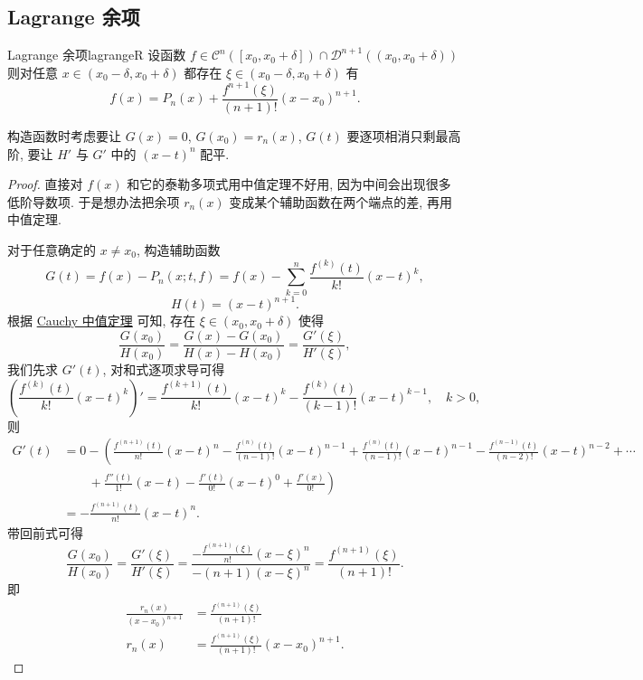 \documentclass[cn,toc=twocol]{elegantbook}
\newcommand{\D}{\mathscr{D}}
\begin{document}
\subsection{Lagrange 余项}

\begin{theorem}{Lagrange 余项}{lagrangeR}
	设函数 $f \in \mathscr{C}^n([x_0,x_0+\delta]) \cap \D^{n+1}((x_0,x_0+\delta))$ 则对任意 $x \in (x_0-\delta,x_0+\delta)$ 都存在 $\xi \in (x_0-\delta,x_0+\delta)$ 有
	\[
		f(x) = P_n(x) + \frac{f^{n+1}(\xi)}{(n+1)!} (x-x_0)^{n+1}.
	\]
\end{theorem}
\begin{idea*}
	构造函数时考虑要让 $G(x)=0$, $G(x_0​)=r_n(x)$, $G(t)$ 要逐项相消只剩最高阶, 要让 $H'$ 与 $G'$ 中的 $(x-t)^n$ 配平.
\end{idea*}

\begin{proof}
	直接对 $f(x)$ 和它的泰勒多项式用中值定理不好用, 因为中间会出现很多低阶导数项. 于是想办法把余项 $r_n(x)$ 变成某个辅助函数在两个端点的差, 再用中值定理.
 
	对于任意确定的 $x \neq x_0$, 构造辅助函数
	\[
		G(t)=f(x)-P_n(x;t,f)=f(x)-\sum_{k=0}^{n}\frac{f^{(k)}(t)}{k!}(x-t)^k,
	\]
	\[
		H(t)=(x-t)^{n+1}.
	\]
	根据 \hyperref[thm:cauchy]{Cauchy 中值定理} 可知, 存在 $\xi \in (x_0,x_0+\delta)$ 使得
	\[
		\frac{G(x_0)}{H(x_0)} = \frac{G(x) - G(x_0)}{H(x) - H(x_0)} = \frac{G'(\xi)}{H'(\xi)},
	\]
	我们先求 $G'(t)$, 对和式逐项求导可得
	\[
		\left(\frac{f^{(k)}(t)}{k!}(x-t)^k\right)' = \frac{f^{(k+1)}(t)}{k!}(x-t)^k - \frac{f^{(k)}(t)}{(k - 1)!}(x-t)^{k - 1},\quad k > 0,
	\]
	则
	\[
	\begin{aligned}
		G'(t) &= 0 - \left(\frac{f^{(n+1)}(t)}{n!}(x-t)^n - \frac{f^{(n)}(t)}{(n - 1)!}(x-t)^{n - 1} + \frac{f^{(n)}(t)}{(n-1)!}(x-t)^{n-1} - \frac{f^{(n - 1)}(t)}{(n - 2)!}(x-t)^{n - 2} + \cdots\right.\\
		&\qquad + \left. \frac{f''(t)}{1!}(x-t) - \frac{f'(t)}{0!}(x-t)^{0} + \frac{f'(x)}{0!}\right)\\
		&= -\frac{f^{(n+1)}(t)}{n!}(x-t)^n.
	\end{aligned}
	\]
	带回前式可得
	\[
		\frac{G(x_0)}{H(x_0)} = \frac{G'(\xi)}{H'(\xi)} = \frac{-\frac{f^{(n+1)}(\xi)}{n!}(x-\xi)^n}{-(n+1)(x-\xi)^{n}} = \frac{f^{(n+1)}(\xi)}{(n+1)!}.
	\]
	即
	\[
	\begin{aligned}
		\frac{r_n(x)}{(x-x_0)^{n+1}} &= \frac{f^{(n+1)}(\xi)}{(n+1)!}\\
		r_n(x) &= \frac{f^{(n+1)}(\xi)}{(n+1)!}(x-x_0)^{n+1}.
	\end{aligned}
	\]
\end{proof}
\end{document}
